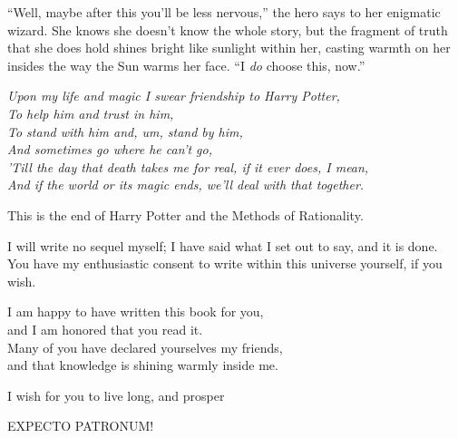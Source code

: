 “Well, maybe after this you’ll be less nervous,” the hero says to her enigmatic wizard. She knows she doesn’t know the whole story, but the fragment of truth that she does hold shines bright like sunlight within her, casting warmth on her insides the way the Sun warms her face. “I \emph{do} choose this, now.”

\noindent{}\emph{Upon my life and magic I swear friendship to Harry Potter,}\\ \emph{To help him and trust in him,}\\ \emph{To stand with him and, um, stand by him,}\\ \emph{And sometimes go where he can’t go,}\\ \emph{’Till the day that death takes me for real, if it ever does, I mean,}\\ \emph{And if the world or its magic ends, we’ll deal with that together.}

\newpage
\begin{chapterOpeningAuthorNote}
This is the end of Harry Potter and the Methods of Rationality.

I will write no sequel myself; I have said what I set out to say, and it is done.\\
You have my enthusiastic consent to write within this universe yourself, if you wish.




I am happy to have written this book for you,\\
and I am honored that you read it.\\
Many of you have declared yourselves my friends,\\
and that knowledge is shining warmly inside me.

I wish for you to live long, and prosper
\end{chapterOpeningAuthorNote}
\begin{chapterOpeningQuote}
EXPECTO PATRONUM!
\end{chapterOpeningQuote}

